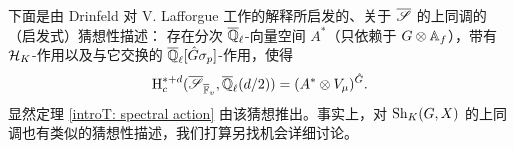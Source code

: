 \begin{rmk}
\label{R: coh of Shimura}
下面是由 Drinfeld 对 V. Lafforgue 工作的解释所启发的、关于 $\overline{\mathscr{S}}$ 的上同调的（启发式）猜想性描述：
存在分次 ${\overline{{\mathbb Q}}_\ell}$-向量空间 $A^*$（只依赖于 $G\otimes{\mathbb A}_f$），带有 ${\mathcal H}_K$-作用以及与它交换的 ${\overline{{\mathbb Q}}_\ell}[\hat{G}\sigma_p]$-作用，使得
$$\operatorname{H}_c^{*+d}(\overline{\mathscr{S}}_{\overline{{\mathbb F}}_v}, {\overline{{\mathbb Q}}_\ell}(d/2)) = (A^*\otimes V_{\mu})^{\hat G}.$$
显然定理 \ref{introT: spectral action} 由该猜想推出。事实上，对 $\operatorname{Sh}_K(G,X)$ 的上同调也有类似的猜想性描述，我们打算另找机会详细讨论。
\end{rmk}
